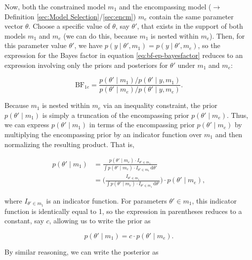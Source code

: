 \documentclass[a4paper,12pt,twoside]{book}
\begin{document}
Now, both the constrained model $m_1$ and the encompassing model ($\rightarrow$ Definition \ref{sec:Model Selection}/\ref{sec:encm}) $m_e$ contain the same parameter vector $\theta$. Choose a specific value of $\theta$, say $\theta'$, that exists in the support of both models $m_1$ and $m_e$ (we can do this, because $m_1$ is nested within $m_e$). Then, for this parameter value $\theta'$, we have $p(y \mid \theta',m_1)=p(y \mid \theta',m_e)$, so the expression for the Bayes factor in equation \eqref{eq:bf-ep-bayesfactor} reduces to an expression involving only the priors and posteriors for $\theta'$ under $m_1$ and $m_e$:

\begin{equation} \label{eq:bf-ep-bayesfactor2}
  \text{BF}_{1e} = \frac{p(\theta' \mid m_1) / p(\theta' \mid y,m_1)}{p(\theta' \mid m_e) / p(\theta' \mid y,m_e)}.
\end{equation}

Because $m_1$ is nested within $m_e$ via an inequality constraint, the prior $p(\theta' \mid m_1)$ is simply a truncation of the encompassing prior $p(\theta' \mid m_e)$. Thus, we can express $p(\theta' \mid m_1)$ in terms of the encompassing prior $p(\theta' \mid m_e)$ by multiplying the encompassing prior by an indicator function over $m_1$ and then normalizing the resulting product.  That is,

\begin{equation} \label{eq:bf-ep-normalize}
\begin{split}
  p(\theta' \mid m_1) & = \frac{p(\theta' \mid m_e) \cdot I_{\theta' \in m_1}}{\int p(\theta' \mid m_e) \cdot I_{\theta' \in m_1} \, \mathrm{d}\theta'}\\
                      & = \Biggl(\frac{I_{\theta' \in m_1}}{\int p(\theta' \mid m_e) \cdot I_{\theta' \in m_1} \, \mathrm{d}\theta'}\Biggr) \cdot p(\theta' \mid m_e),
\end{split}
\end{equation}

where $I_{\theta' \in m_1}$ is an indicator function. For parameters $\theta' \in m_1$, this indicator function is identically equal to 1, so the expression in parentheses reduces to a constant, say $c$, allowing us to write the prior as

\begin{equation} \label{eq:bf-ep-prior}
  p(\theta' \mid m_1) = c \cdot p(\theta' \mid m_e).
\end{equation}

By similar reasoning, we can write the posterior as
\end{document}
